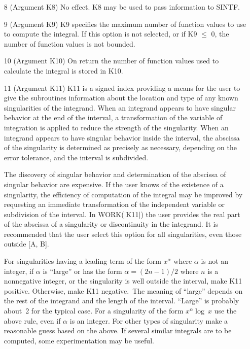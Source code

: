 \documentclass[twoside]{MATH77}
\begin{document}
\begin{itemize}
\item[8]  (Argument K8) No effect. K8 may be used to pass information to
SINTF.

\item[9]  (Argument K9) K9 specifies the maximum number of function values
to use to compute the integral. If this option is not selected, or if K9 $%
\leq $ 0, the number of function values is not bounded.

\item[10]  (Argument K10) On return the number of function values used to
calculate the integral is stored in K10.

\item[11]  (Argument K11) K11 is a signed index providing a means for the
user to give the subroutines information about the location and type of any
known singularities of the integrand. When an integrand appears to have
singular behavior at the end of the interval, a transformation of the
variable of integration is applied to reduce the strength of the
singularity. When an integrand appears to have singular behavior inside the
interval, the abscissa of the singularity is determined as precisely as
necessary, depending on the error tolerance, and the interval is subdivided.

The discovery of singular behavior and determination of the abscissa of
singular behavior are expensive. If the user knows of the existence
of a singularity, the efficiency of computation of the integral may be
improved by requesting an immediate transformation of the independent
variable or subdivision of the interval. In WORK($|$K11$|$) the user
provides the real part of the abscissa of a singularity or discontinuity
in the integrand. It is recommended that the user select this option for
all singularities, even those outside [A, B].

For singularities having a leading term of the form $x^\alpha $ where $%
\alpha $ is not an integer, if $\alpha $ is ``large'' or has the form $%
\alpha =(2n-1)/2$ where $n$ is a nonnegative integer, or the singularity is
well outside the interval, make K11 positive. Otherwise, make K11 negative.\
The meaning of ``large'' depends on the rest of the integrand and the length
of the interval. ``Large'' is probably about~2 for the typical case. For a
singularity of the form $x^\alpha \log \ x$ use the above rule, even if $%
\alpha $ is an integer. For other types of singularity make a reasonable
guess based on the above. If several similar integrals are to be computed,
some experimentation may be useful.


\end{itemize}
\end{document}
